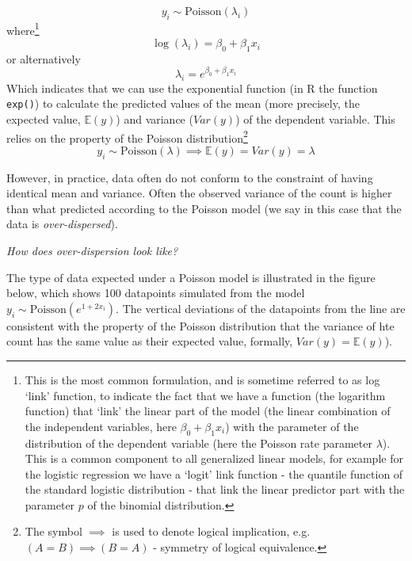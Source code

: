 \documentclass[
]{book}
\begin{document}
\[
y_i \sim \text{Poisson} \left(\lambda_i \right)
\]
where\footnote{This is the most common formulation, and is sometime referred to as log `link' function, to indicate the fact that we have a function (the logarithm function) that `link' the linear part of the model (the linear combination of the independent variables, here \(\beta_0 + \beta_1 x_i\)) with the parameter of the distribution of the dependent variable (here the Poisson rate parameter \(\lambda\)). This is a common component to all generalized linear models, for example for the logistic regression we have a `logit' link function - the quantile function of the standard logistic distribution - that link the linear predictor part with the parameter \(p\) of the binomial distribution.}
\[
\log( \lambda_i) = \beta_0 + \beta_1 x_i
\]
or alternatively
\[
\lambda_i = e^{\beta_0 + \beta_1 x_i}
\]
Which indicates that we can use the exponential function (in R the function \texttt{exp()}) to calculate the predicted values of the mean (more precisely, the expected value, \(\mathbb{E}(y)\)) and variance (\(Var(y)\)) of the dependent variable. This relies on the property of the Poisson distribution\footnote{The symbol \(\implies\) is used to denote logical implication, e.g.~\((A=B)\implies (B=A)\) - symmetry of logical equivalence.}
\[
y_i \sim \text{Poisson} \left(\lambda \right) \implies \mathbb{E}(y)=Var(y)=\lambda
\]

However, in practice, data often do not conform to the constraint of having identical mean and variance. Often the observed variance of the count is higher than what predicted according to the Poisson model (we say in this case that the data is \emph{over-dispersed}).

\emph{How does over-dispersion look like?}

The type of data expected under a Poisson model is illustrated in the figure below, which shows 100 datapoints simulated from the model \(y_i \sim \text{Poisson} \left(e^{1 + 2x_i }\right)\). The vertical deviations of the datapoints from the line are consistent with the property of the Poisson distribution that the variance of hte count has the same value as their expected value, formally, \(Var(y) = \mathbb{E}(y)\)).
\end{document}
